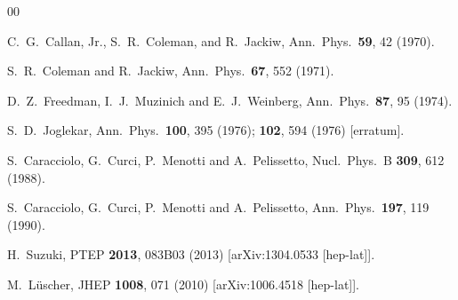 \begin{thebibliography}{00}

  C.~G.~Callan, Jr., S.~R.~Coleman, and R.~Jackiw,
  Ann.\ Phys.\  {\bf 59}, 42 (1970).

  S.~R.~Coleman and R.~Jackiw,
  Ann.\ Phys.\  {\bf 67}, 552 (1971).

  D.~Z.~Freedman, I.~J.~Muzinich and E.~J.~Weinberg,
  Ann.\ Phys.\  {\bf 87}, 95 (1974).

  S.~D.~Joglekar,
  Ann.\ Phys.\  {\bf 100}, 395 (1976);
  {\bf 102}, 594 (1976) [erratum].

  S.~Caracciolo, G.~Curci, P.~Menotti and A.~Pelissetto,
  Nucl.\ Phys.\ B {\bf 309}, 612 (1988).

  S.~Caracciolo, G.~Curci, P.~Menotti and A.~Pelissetto,
  Ann.\ Phys.\  {\bf 197}, 119 (1990).

  H.~Suzuki,
  PTEP {\bf 2013}, 083B03 (2013)
  [arXiv:1304.0533 [hep-lat]].

  M.~L\"uscher,
  JHEP {\bf 1008}, 071 (2010)
  [arXiv:1006.4518 [hep-lat]].


\end{thebibliography}
